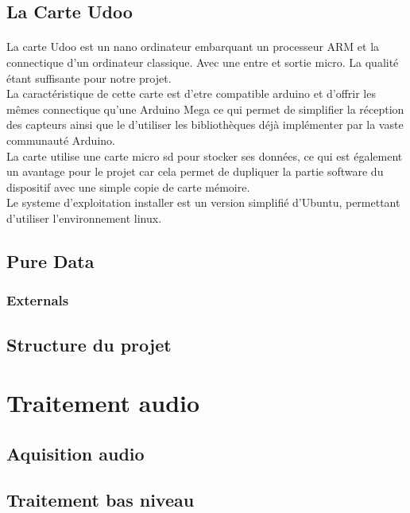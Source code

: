\documentclass[a4paper, titlepage, oneside, 12pt]{article}%
\begin{document}
\subsection{La Carte Udoo}
\paragraph{}
La carte Udoo est un nano ordinateur embarquant un processeur ARM et la connectique d'un ordinateur classique. Avec une entre et sortie micro. La qualité étant suffisante pour notre projet.\\
La caractéristique de cette carte est d'etre compatible arduino et d'offrir les mêmes connectique qu'une Arduino Mega ce qui permet de simplifier la réception des capteurs ainsi que le d'utiliser les bibliothèques déjà implémenter par la vaste communauté Arduino.\\
La carte utilise une carte micro sd pour stocker ses données, ce qui est également un avantage pour le projet car cela permet de dupliquer la partie software du dispositif avec une simple copie de carte mémoire.\\
Le systeme d'exploitation installer est un version simplifié d'Ubuntu, permettant d'utiliser l’environnement linux.

\subsection{Pure Data}

\subsubsection{Externals}
\subsection{Structure du projet}

\newpage
\section{Traitement audio}
\subsection{Aquisition audio}

\subsection{Traitement bas niveau}
\end{document}
